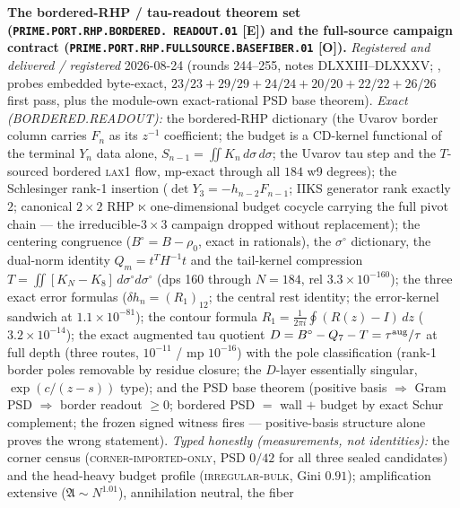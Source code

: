 \par\smallskip\noindent\textbf{The bordered-RHP / tau-readout
theorem set (\texttt{PRIME.PORT.RHP.BORDERED.\allowbreak
READOUT.01} [E]) and the full-source campaign contract
(\texttt{PRIME.PORT.RHP.FULLSOURCE.\allowbreak BASEFIBER.01}
[O]).}
{\sloppy
\emph{Registered and delivered / registered} 2026-08-24 (rounds
244--255, notes DLXXIII--DLXXXV;
, probes
embedded byte-exact, $23/23 + 29/29 + 24/24 + 20/20 + 22/22 +
26/26$ first pass, plus the module-own exact-rational PSD base
theorem).  \emph{Exact (BORDERED.READOUT):} the bordered-RHP
dictionary (the Uvarov border column carries $F_n$ as its
$z^{-1}$ coefficient; the budget is a CD-kernel functional of the
terminal $Y_n$ data alone, $S_{n-1} = \iint K_n\,d\sigma\,
d\sigma$; the Uvarov tau step and the $T$-sourced bordered
\textsc{lax1} flow, mp-exact through all $184$ w9 degrees); the
Schlesinger rank-1 insertion ($\det Y_3 = -h_{n-2}F_{n-1}$; IIKS
generator rank exactly $2$; canonical $2\times2$ RHP $\ltimes$
one-dimensional budget cocycle carrying the full pivot chain ---
the irreducible-$3\times3$ campaign dropped without replacement);
the centering congruence ($B^{\circ} = B - \rho_0$, exact in
rationals), the $\sigma^{\circ}$ dictionary, the dual-norm
identity $Q_m = t^{T}H^{-1}t$ and the tail-kernel compression
$T = \iint[K_N - K_8]\,d\sigma^{\circ}d\sigma^{\circ}$ (dps 160
through $N = 184$, rel $3.3\times10^{-160}$); the three exact
error formulas ($\delta h_n = (R_1)_{12}$; the central rest
identity; the error-kernel sandwich at $1.1\times10^{-81}$); the
contour formula $R_1 = \tfrac{1}{2\pi i}\oint(R(z) - I)\,dz$
($3.2\times10^{-14}$); the exact augmented tau quotient $D =
B^{\circ} - Q_7 - T = \tau^{\rm aug}/\tau$ at full depth (three
routes, $10^{-11}$ / mp $10^{-16}$) with the pole classification
(rank-1 border poles removable by residue closure; the $D$-layer
essentially singular, $\exp(c/(z-s))$ type); and the PSD base
theorem (positive basis $\Rightarrow$ Gram PSD $\Rightarrow$
border readout $\ge 0$; bordered PSD $=$ wall $+$ budget by exact
Schur complement; the frozen signed witness fires ---
positive-basis structure alone proves the wrong statement).
\emph{Typed honestly (measurements, not identities):} the corner
census (\textsc{corner-imported-only}, PSD $0/42$ for all three
sealed candidates) and the head-heavy budget profile
(\textsc{irregular-bulk}, Gini $0.91$); amplification extensive
($\mathfrak{A} \sim N^{1.01}$), annihilation neutral, the fiber
}

